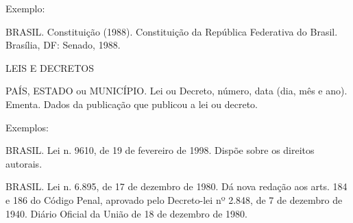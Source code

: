 Exemplo:

BRASIL. Constituição (1988). Constituição da República Federativa do Brasil. Brasília, DF: Senado, 1988.


LEIS E DECRETOS 

PAÍS, ESTADO ou MUNICÍPIO. Lei ou Decreto, número, data (dia, mês e ano). Ementa. Dados da publicação que publicou a lei ou decreto.


Exemplos:

BRASIL. Lei n. 9610, de 19 de fevereiro de 1998. Dispõe sobre os direitos autorais.

BRASIL. Lei n. 6.895, de 17 de dezembro de 1980. Dá nova redação aos arts. 184 e 186 do Código Penal, aprovado pelo Decreto-lei nº 2.848, de 7 de dezembro de 1940. Diário Oficial da União de 18 de dezembro de 1980.


